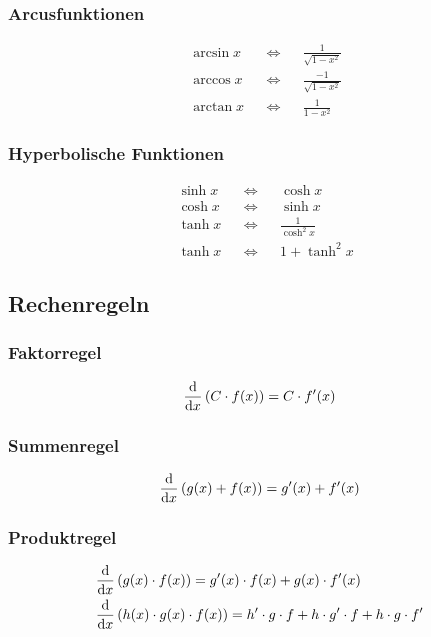 \newpage
\begin{multicols}{2}
\subsubsection*{Arcusfunktionen}
 \begin{align*} 
  &\arcsin x& &\Longleftrightarrow& &\frac{1}{\sqrt{1-x^2}}\\
  &\arccos x& &\Longleftrightarrow& &\frac{-1}{\sqrt{1-x^2}}\\
  &\arctan x& &\Longleftrightarrow& &\frac{1}{1-x^2}
\end{align*}
\vfill
\subsubsection*{Hyperbolische Funktionen}
 \begin{align*} 
  &\sinh x& &\Longleftrightarrow& &\cosh x\\
  &\cosh x& &\Longleftrightarrow& &\sinh x\\
  &\tanh x& &\Longleftrightarrow& &\frac{1}{\cosh^2 x}\\
  &\tanh x& &\Longleftrightarrow& &1+\tanh^2 x
\end{align*}
\vfill
\end{multicols}

\subsection{Rechenregeln}
\begin{multicols}{2}
\subsubsection*{Faktorregel}
 \begin{align*} 
\frac{\mathop{}\!\mathrm{d} }{\mathop{}\!\mathrm{d} x}\left(C\cdot f(x)\right)=C\cdot f'(x)
 \end{align*}
\vfill
\subsubsection*{Summenregel}
 \begin{align*} 
\frac{\mathop{}\!\mathrm{d} }{\mathop{}\!\mathrm{d} x}\left(g(x) + f(x)\right)=g'(x)+f'(x)
 \end{align*}
\vfill
\end{multicols}


\subsubsection*{Produktregel}
 \begin{align*} 
\frac{\mathop{}\!\mathrm{d} }{\mathop{}\!\mathrm{d} x}&\left(g(x)\cdot f(x)\right)=g'(x)\cdot f(x)+g(x)\cdot f'(x)\\
\frac{\mathop{}\!\mathrm{d} }{\mathop{}\!\mathrm{d} x}&\left(h(x)\cdot g(x)\cdot f(x)\right)=h'\cdot g\cdot f+h\cdot g'\cdot f+h\cdot g\cdot f'
 \end{align*}

